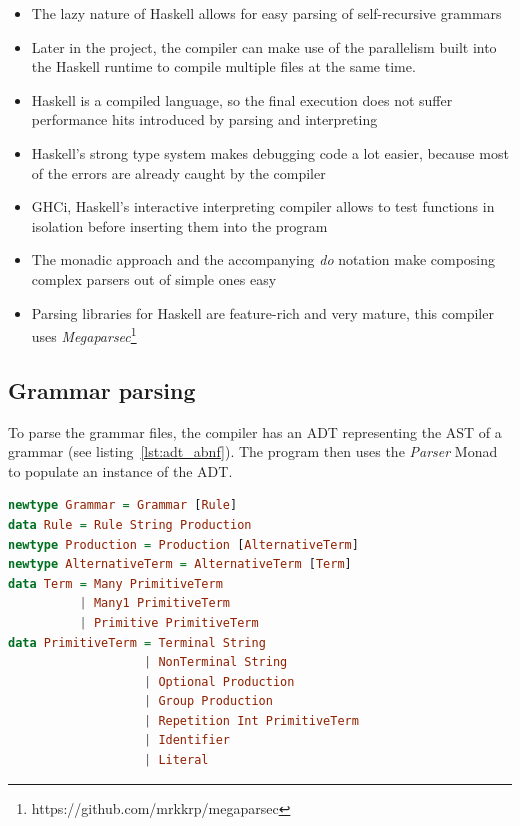 \begin{itemize}

\item{The lazy nature of Haskell allows for easy parsing of self-recursive grammars}
\item{Later in the project, the compiler can make use of the parallelism built into the Haskell runtime to compile multiple files at the same time.}
\item{Haskell is a compiled language, so the final execution does not suffer performance hits introduced by parsing and interpreting}
\item{Haskell's strong type system makes debugging code a lot easier, because most of the errors are already caught by the compiler}
\item{GHCi, Haskell's interactive interpreting compiler allows to test functions in isolation before inserting them into the program}
\item{The monadic approach and the accompanying \textit{do} notation make composing complex parsers out of simple ones easy}
\item{Parsing libraries for Haskell are feature-rich and very mature, this compiler uses \textit{Megaparsec}\footnote{https://github.com/mrkkrp/megaparsec}}

\end{itemize}

\subsection{Grammar parsing}

To parse the grammar files, the compiler has an ADT representing the AST of a grammar (see listing~\ref{lst:adt_abnf}). The program then uses the \textit{Parser} Monad to populate an instance of the ADT.

\begin{lstlisting}[linewidth=\columnwidth, caption={ADT of ABNF grammar}, captionpos=b, label=lst:adt_abnf, language=Haskell]
newtype Grammar = Grammar [Rule]
data Rule = Rule String Production
newtype Production = Production [AlternativeTerm]
newtype AlternativeTerm = AlternativeTerm [Term]
data Term = Many PrimitiveTerm
          | Many1 PrimitiveTerm
          | Primitive PrimitiveTerm
data PrimitiveTerm = Terminal String
                   | NonTerminal String
                   | Optional Production
                   | Group Production
                   | Repetition Int PrimitiveTerm
                   | Identifier
                   | Literal
\end{lstlisting}

